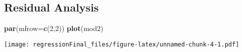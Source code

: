 \documentclass[]{article}
\newenvironment{Shaded}{\begin{snugshade}}{\end{snugshade}}
\newcommand{\KeywordTok}[1]{\textcolor[rgb]{0.13,0.29,0.53}{\textbf{#1}}}
\newcommand{\DataTypeTok}[1]{\textcolor[rgb]{0.13,0.29,0.53}{#1}}
\newcommand{\DecValTok}[1]{\textcolor[rgb]{0.00,0.00,0.81}{#1}}
\newcommand{\NormalTok}[1]{#1}
\begin{document}
\subsection{Residual Analysis}\label{residual-analysis}

\begin{Shaded}
\begin{Highlighting}[]
\KeywordTok{par}\NormalTok{(}\DataTypeTok{mfrow=}\KeywordTok{c}\NormalTok{(}\DecValTok{2}\NormalTok{,}\DecValTok{2}\NormalTok{))}
\KeywordTok{plot}\NormalTok{(mod2)}
\end{Highlighting}
\end{Shaded}

\texttt{[image: regressionFinal\_files/figure-latex/unnamed-chunk-4-1.pdf]}
\end{document}
